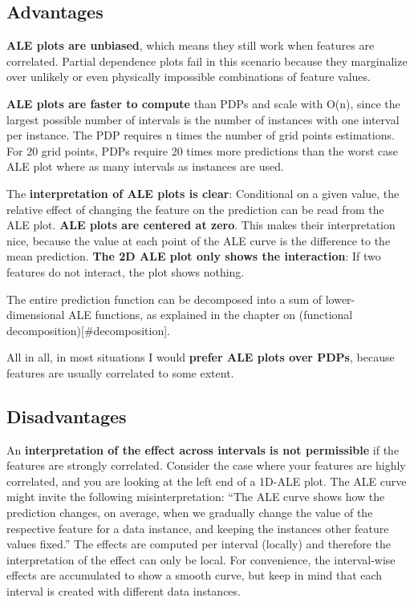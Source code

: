 \documentclass[
  12pt,
]{krantz}
\begin{document}
\hypertarget{advantages-6}{%
\subsection{Advantages}\label{advantages-6}}

\textbf{ALE plots are unbiased}, which means they still work when features are correlated.
Partial dependence plots fail in this scenario because they marginalize over unlikely or even physically impossible combinations of feature values.

\textbf{ALE plots are faster to compute} than PDPs and scale with O(n), since the largest possible number of intervals is the number of instances with one interval per instance.
The PDP requires n times the number of grid points estimations.
For 20 grid points, PDPs require 20 times more predictions than the worst case ALE plot where as many intervals as instances are used.

The \textbf{interpretation of ALE plots is clear}: Conditional on a given value, the relative effect of changing the feature on the prediction can be read from the ALE plot.
\textbf{ALE plots are centered at zero}.
This makes their interpretation nice, because the value at each point of the ALE curve is the difference to the mean prediction.
\textbf{The 2D ALE plot only shows the interaction}:
If two features do not interact, the plot shows nothing.

The entire prediction function can be decomposed into a sum of lower-dimensional ALE functions, as explained in the chapter on (functional decomposition){[}\#decomposition{]}.

All in all, in most situations I would \textbf{prefer ALE plots over PDPs}, because features are usually correlated to some extent.

\hypertarget{disadvantages-6}{%
\subsection{Disadvantages}\label{disadvantages-6}}

An \textbf{interpretation of the effect across intervals is not permissible} if the features are strongly correlated.
Consider the case where your features are highly correlated, and you are looking at the left end of a 1D-ALE plot.
The ALE curve might invite the following misinterpretation:
``The ALE curve shows how the prediction changes, on average, when we gradually change the value of the respective feature for a data instance, and keeping the instances other feature values fixed.''
The effects are computed per interval (locally) and therefore the interpretation of the effect can only be local.
For convenience, the interval-wise effects are accumulated to show a smooth curve, but keep in mind that each interval is created with different data instances.
\end{document}
